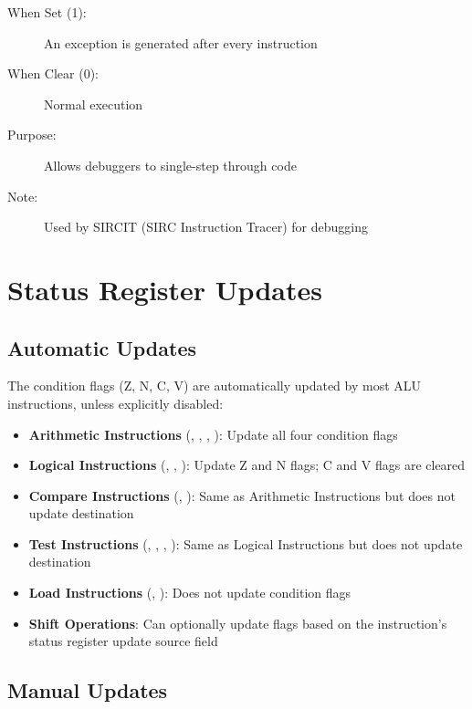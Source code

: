 \begin{description}
	\item[When Set (1):] An exception is generated after every instruction
	\item[When Clear (0):] Normal execution
	\item[Purpose:] Allows debuggers to single-step through code
	\item[Note:] Used by SIRCIT (SIRC Instruction Tracer) for debugging
\end{description}

\section{Status Register Updates}

\subsection{Automatic Updates}

The condition flags (Z, N, C, V) are automatically updated by most ALU instructions, unless explicitly disabled:

\begin{itemize}
	\item \textbf{Arithmetic Instructions} (, , , ): Update all four condition flags
	\item \textbf{Logical Instructions} (, , ): Update Z and N flags; C and V flags are cleared
	\item \textbf{Compare Instructions} (, ): Same as Arithmetic Instructions but does not update destination
	\item \textbf{Test Instructions} (, , , ): Same as Logical Instructions but does not update destination
	\item \textbf{Load Instructions} (, ): Does not update condition flags
	\item \textbf{Shift Operations}: Can optionally update flags based on the instruction's status register update source field
\end{itemize}

\subsection{Manual Updates}

